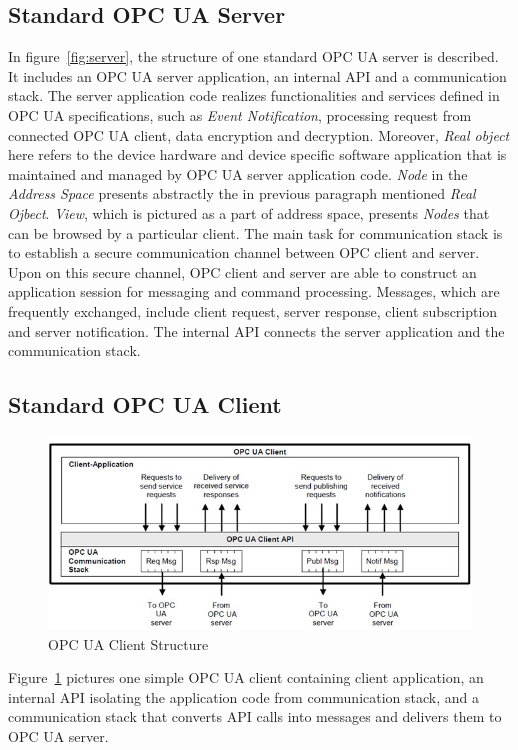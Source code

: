 \subsection{Standard OPC UA Server}
In figure~\ref{fig:server}, the structure of one standard OPC UA server is described. It includes an OPC UA server application, an internal API and a communication stack. The server application code realizes 	functionalities and services defined in OPC UA specifications, such as \emph{Event Notification}, processing request from connected OPC UA client, data encryption and decryption. Moreover, \emph{Real object}  here refers to the device hardware and device specific software application that is maintained and managed by OPC UA server application code. \emph{Node} in the \emph{Address Space} presents abstractly the in previous paragraph mentioned \emph{Real Ojbect}. \emph{View}, which is pictured as a part of address space, presents \emph{Nodes} that can be browsed by a particular client. The main task for communication stack is to establish a secure communication channel between OPC client and server. Upon on this secure channel, OPC client and server are able to construct an application session for messaging and command processing.
Messages, which are frequently exchanged, include client request, server response, client subscription and server notification. The internal API connects the server application and the communication stack.

\subsection{Standard OPC UA Client}
\begin{figure}[!htbp]
	\centering
	\includegraphics[width=1.0\textwidth]{client.jpg}
		\caption{OPC UA Client Structure \cite{O1}}
	\label{fig:client}
\end{figure}

Figure~\ref{fig:client} pictures one simple OPC UA client containing client application, an internal API isolating the application code from communication stack, and a communication stack that converts API calls into messages and delivers them to OPC UA server.

